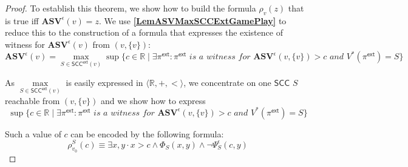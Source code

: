 \begin{proof}
\noindent To establish this theorem, we show how to build the formula $\rho_v(z)$ that is true iff $\mathbf{ASV}^{\epsilon}(v) = z$. We use \textbf{\cref{LemASVMaxSCCExtGamePlay}} to reduce this to the construction of a formula that expresses the existence of witness for $\mathbf{ASV}^{\epsilon}(v)$ from $(v, \{v\})$:
 \begin{equation*}
     \mathbf{ASV}^{\epsilon}(v) = \max \limits_{S \in \mathsf{SCC}^{\mathsf{ext}}(v)} \sup \{c \in \mathbb{R} \mid \exists \pi^{\mathsf{ext}}: \pi^{\mathsf{ext}} \textit{ is a witness for } \mathbf{ASV}^{\epsilon}(v, \{v\}) > c \textit{ and } V^{*}(\pi^{\mathsf{ext}}) = S \}
 \end{equation*}
 
\noindent As $\max \limits_{S \in \mathsf{SCC}^{\mathsf{ext}}(v)}$ is easily expressed in $\langle \mathbb{R}, +, < \rangle$, we concentrate on one $\mathsf{SCC}$ $S$ reachable from $(v, \{v\})$ and we show how to express
 \begin{equation*}
     \sup \{ c \in \mathbb{R} \mid \exists \pi^{\mathsf{ext}}: \pi^{\mathsf{ext}} \textit{ is a witness for } \mathbf{ASV}^{\epsilon}(v, \{v\}) > c \textit{ and } V^{*}(\pi^{\mathsf{ext}}) = S \}
 \end{equation*}

\noindent Such a value of $c$ can be encoded by the following formula:
\begin{equation*}
    \rho^S_{v_0}(c) \equiv \exists x,y \cdot x > c \land \Phi_S(x,y) \land \neg \Psi_S^{\epsilon}(c, y)
\end{equation*}


\end{proof}
